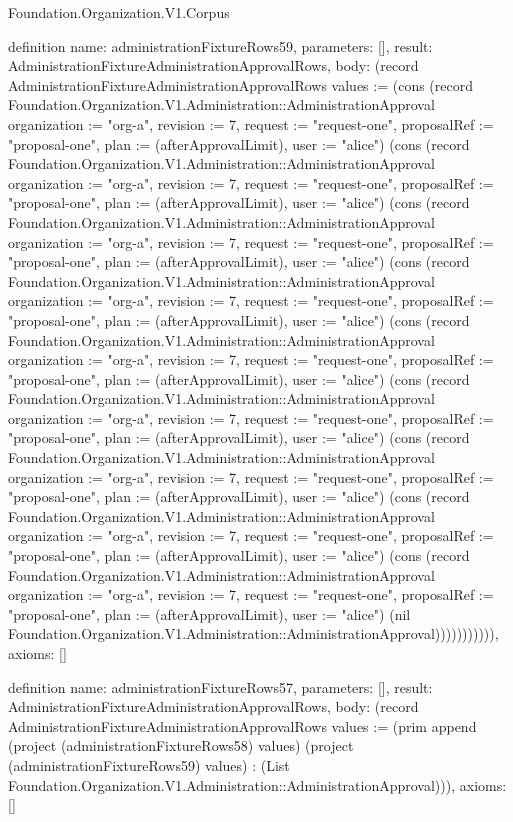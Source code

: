 \begin{lexlean}{Foundation.Organization.V1.Corpus}
\begin{semanticmodule}
definition{
  name: administrationFixtureRows59,
  parameters: [],
  result: AdministrationFixtureAdministrationApprovalRows,
  body: (record AdministrationFixtureAdministrationApprovalRows {values := (cons (record Foundation.Organization.V1.Administration::AdministrationApproval {organization := "org-a", revision := 7, request := "request-one", proposalRef := "proposal-one", plan := (afterApprovalLimit), user := "alice"}) (cons (record Foundation.Organization.V1.Administration::AdministrationApproval {organization := "org-a", revision := 7, request := "request-one", proposalRef := "proposal-one", plan := (afterApprovalLimit), user := "alice"}) (cons (record Foundation.Organization.V1.Administration::AdministrationApproval {organization := "org-a", revision := 7, request := "request-one", proposalRef := "proposal-one", plan := (afterApprovalLimit), user := "alice"}) (cons (record Foundation.Organization.V1.Administration::AdministrationApproval {organization := "org-a", revision := 7, request := "request-one", proposalRef := "proposal-one", plan := (afterApprovalLimit), user := "alice"}) (cons (record Foundation.Organization.V1.Administration::AdministrationApproval {organization := "org-a", revision := 7, request := "request-one", proposalRef := "proposal-one", plan := (afterApprovalLimit), user := "alice"}) (cons (record Foundation.Organization.V1.Administration::AdministrationApproval {organization := "org-a", revision := 7, request := "request-one", proposalRef := "proposal-one", plan := (afterApprovalLimit), user := "alice"}) (cons (record Foundation.Organization.V1.Administration::AdministrationApproval {organization := "org-a", revision := 7, request := "request-one", proposalRef := "proposal-one", plan := (afterApprovalLimit), user := "alice"}) (cons (record Foundation.Organization.V1.Administration::AdministrationApproval {organization := "org-a", revision := 7, request := "request-one", proposalRef := "proposal-one", plan := (afterApprovalLimit), user := "alice"}) (cons (record Foundation.Organization.V1.Administration::AdministrationApproval {organization := "org-a", revision := 7, request := "request-one", proposalRef := "proposal-one", plan := (afterApprovalLimit), user := "alice"}) (nil Foundation.Organization.V1.Administration::AdministrationApproval))))))))))}),
  axioms: []
}

definition{
  name: administrationFixtureRows57,
  parameters: [],
  result: AdministrationFixtureAdministrationApprovalRows,
  body: (record AdministrationFixtureAdministrationApprovalRows {values := (prim append (project (administrationFixtureRows58) values) (project (administrationFixtureRows59) values) : (List Foundation.Organization.V1.Administration::AdministrationApproval))}),
  axioms: []
}


\end{semanticmodule}
\end{lexlean}
